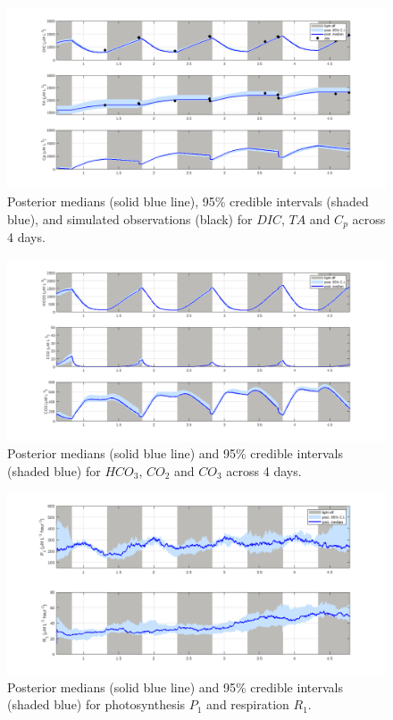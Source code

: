 \documentclass{ruthesis}
\begin{document}
\begin{figure}
	\centerline{\includegraphics[width=1.2\textwidth]{images_microalgae/plots_chris_offset_sigma/DIC_TA_Cp}}
	\caption[.]{Posterior medians (solid blue line), 95\% credible intervals (shaded blue), and simulated observations (black) for $DIC$, $TA$ and $C_p$ across 4 days.}
	\label{fig:micro_exp_offset_sigma_DIC_TA_Cp}
\end{figure}

\begin{figure}
	\centerline{\includegraphics[width=1.2\textwidth]{images_microalgae/plots_chris_offset_sigma/carbon}}
	\caption[.]{Posterior medians (solid blue line) and 95\% credible intervals (shaded blue) for $HCO_3$, $CO_2$ and $CO_3$ across 4 days.}
	\label{fig:micro_exp_offset_sigma_carbon}
\end{figure}

\begin{figure}
	\centerline{\includegraphics[width=1.2\textwidth]{images_microalgae/plots_chris_offset_sigma/P_and_R}}
	\caption[.]{Posterior medians (solid blue line) and 95\% credible intervals (shaded blue) for photosynthesis $P_1$ and respiration $R_1$.}
	\label{fig:micro_exp_offset_sigma_P_R}
\end{figure}
\end{document}
